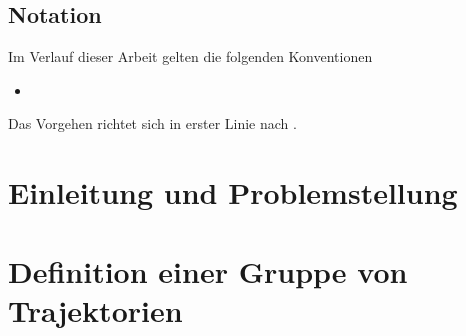 




\tableofcontents

\section*{Notation}
Im Verlauf dieser Arbeit gelten die folgenden Konventionen
\begin{itemize}
	\item 
\end{itemize}
Das Vorgehen richtet sich in erster Linie nach \textcite{buchin2015}.
\cleardoubleoddemptypage
{}
\setcounter{page}{1}
\setcounter{footnote}{0}

\chapter{Einleitung und Problemstellung} %
\label{cha:einleitung}


\chapter{Definition einer Gruppe von Trajektorien} %
\label{cha:def_gruppe}







\cleardoubleoddemptypage
{}
\setcounter{page}{1}
\appendix
\printindex
\listoffigures
\printbibliography
\todototoc
{}

